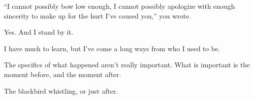 \begin{ally}
``I cannot possibly bow low enough, I cannot possibly apologize with enough sincerity to make up for the hurt I've caused you,'' you wrote.
\end{ally}
Yes. And I stand by it.

I have much to learn, but I've come a long ways from who I used to be.

The specifics of what happened aren't really important. What is important is the moment before, and the moment after.

\begin{ally}
The blackbird whistling, or just after.
\end{ally}
\newpage

